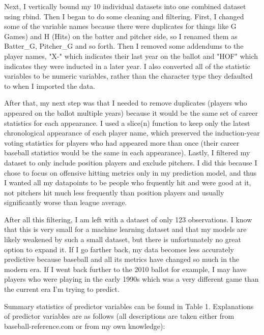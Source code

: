 \documentclass[12pt,english]{article}
\begin{document}
Next, I vertically bound my 10 individual datasets into one combined dataset using rbind. Then I began to do some cleaning and filtering. First, I changed some of the variable names because there were duplicates for things like G Games) and H (Hits) on the batter and pitcher side, so I renamed them as Batter\_G, Pitcher\_G and so forth. Then I removed some addendums to the player names, "X-" which indicates their last year on the ballot and "HOF" which indicates they were inducted in a later year. I also converted all of the statistic variables to be numeric variables, rather than the character type they defaulted to when I imported the data. 

After that, my next step was that I needed to remove duplicates (players who appeared on the ballot multiple years) because it would be the same set of career statistics for each appearance. I used a slice(n) function to keep only the latest chronological appearance of each player name, which preserved the induction-year voting statistics for players who had appeared more than once (their career baseball statistics would be the same in each appearance). Lastly, I filtered my dataset to only include position players and exclude pitchers. I did this because I chose to focus on offensive hitting metrics only in my prediction model, and thus I wanted all my datapoints to be people who frquently hit and were good at it, not pitchers hit much less frequently than position players and usually significantly worse than league average. 

After all this filtering, I am left with a dataset of only 123 observations. I know that this is very small for a machine learning dataset and that my models are likely weakened by such a small dataset, but there is unfortunately no great option to expand it. If I go farther back, my data becomes less accurately predictive because baseball and all its metrics have changed so much in the modern era. If I went back further to the 2010 ballot for example, I may have players who were playing in the early 1990s which was a very different game than the current era I'm trying to predict.

Summary statistics of predictor variables can be found in Table 1. Explanations of predictor variables are as follows (all descriptions are taken either from baseball-reference.com or from my own knowledge):
\end{document}
